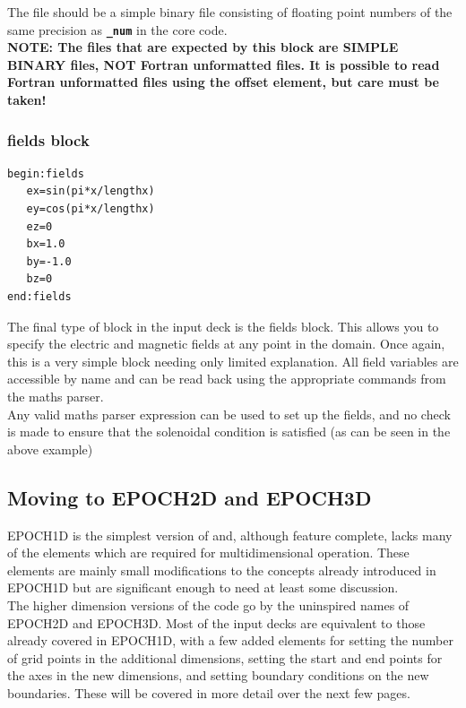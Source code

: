 \documentclass[12pt,a4paper]{article}
\newcommand{\emphtext}{\color{warwickdark} \fontfamily{phv}\selectfont\Large\bf}
\newcommand{\boxverbatim}[1]{\begin{Verbatim}[obeytabs=true,frame=single,
  framerule=0.5mm,rulecolor=\color{warwickmid},formatcom=\color{black},label=#1]}
\newcommand{\inlinecode}[1]{{\color{warwickred} \bf\texttt{#1}}}
\newcommand{\inlineemph}[1]{{\color{warwicklight} \bf{#1}}}
\newcommand{\EPOCH}{{\color{warwickdark}\fontfamily{phv}\selectfont{EPOCH}}}
\begin{document}
The file should be a simple binary file consisting of floating point numbers of
the same precision as \inlinecode{\_num} in the core {\EPOCH} code.\\

{ \emphtext NOTE: The files that are expected by this block are SIMPLE BINARY
files, NOT Fortran unformatted files. It is possible to read Fortran
unformatted files using the offset element, but care must be taken!}\\

\subsubsection{\inlineemph{fields} block}
\boxverbatim{fields block}
begin:fields
   ex=sin(pi*x/lengthx)
   ey=cos(pi*x/lengthx)
   ez=0
   bx=1.0
   by=-1.0
   bz=0
end:fields
\end{Verbatim}

The final type of block in the {\EPOCH} input deck is the fields block. This
allows you to specify the electric and magnetic fields at any point in the
domain. Once again, this is a very simple block needing only limited
explanation. All field variables are accessible by name and can be read back
using the appropriate commands from the maths parser. \\

Any valid maths parser expression can be used to set up the fields, and no
check is made to ensure that the solenoidal condition is satisfied (as can be
seen in the above example)\\

\subsection{Moving to EPOCH2D and EPOCH3D}
EPOCH1D is the simplest version of {\EPOCH} and, although feature complete, lacks
many of the elements which are required for multidimensional operation. These
elements are mainly small modifications to the concepts already introduced in
EPOCH1D but are significant enough to need at least some discussion.\\

The higher dimension versions of the code go by the uninspired names of EPOCH2D
and EPOCH3D. Most of the input decks are equivalent to those already covered in
EPOCH1D, with a few added elements for setting the number of grid points in the
additional dimensions, setting the start and end points for the axes in the new
dimensions, and setting boundary conditions on the new boundaries. These will
be covered in more detail over the next few pages.\\
\end{document}
